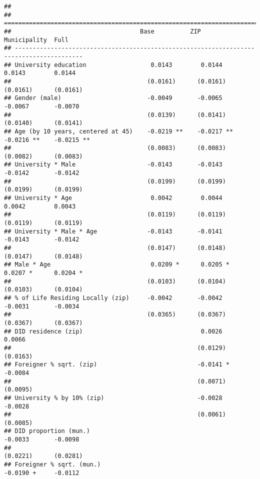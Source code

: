 \documentclass[
]{article}
\begin{document}
\begin{verbatim}
## 
## =========================================================================================
##                                    Base          ZIP           Municipality  Full        
## -----------------------------------------------------------------------------------------
## University education                  0.0143        0.0144        0.0143        0.0144   
##                                      (0.0161)      (0.0161)      (0.0161)      (0.0161)  
## Gender (male)                        -0.0049       -0.0065       -0.0067       -0.0070   
##                                      (0.0139)      (0.0141)      (0.0140)      (0.0141)  
## Age (by 10 years, centered at 45)    -0.0219 **    -0.0217 **    -0.0216 **    -0.0215 **
##                                      (0.0083)      (0.0083)      (0.0082)      (0.0083)  
## University * Male                    -0.0143       -0.0143       -0.0142       -0.0142   
##                                      (0.0199)      (0.0199)      (0.0199)      (0.0199)  
## University * Age                      0.0042        0.0044        0.0042        0.0043   
##                                      (0.0119)      (0.0119)      (0.0119)      (0.0119)  
## University * Male * Age              -0.0143       -0.0141       -0.0143       -0.0142   
##                                      (0.0147)      (0.0148)      (0.0147)      (0.0148)  
## Male * Age                            0.0209 *      0.0205 *      0.0207 *      0.0204 * 
##                                      (0.0103)      (0.0104)      (0.0103)      (0.0104)  
## % of Life Residing Locally (zip)     -0.0042       -0.0042       -0.0031       -0.0034   
##                                      (0.0365)      (0.0367)      (0.0367)      (0.0367)  
## DID residence (zip)                                 0.0026                      0.0066   
##                                                    (0.0129)                    (0.0163)  
## Foreigner % sqrt. (zip)                            -0.0141 *                   -0.0084   
##                                                    (0.0071)                    (0.0095)  
## University % by 10% (zip)                          -0.0028                     -0.0028   
##                                                    (0.0061)                    (0.0085)  
## DID proportion (mun.)                                            -0.0033       -0.0098   
##                                                                  (0.0221)      (0.0281)  
## Foreigner % sqrt. (mun.)                                         -0.0190 +     -0.0112   

\end{verbatim}
\end{document}
